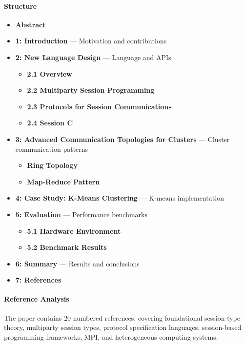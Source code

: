 \documentclass{article}
\begin{document}
\paragraph{Structure}
\begin{itemize}
    \item \textbf{Abstract}

    \item \textbf{1: Introduction} --- Motivation and contributions

    \item \textbf{2: New Language Design} --- Language and APIs
    \begin{itemize}
        \item \textbf{2.1 Overview}
        \item \textbf{2.2 Multiparty Session Programming}
        \item \textbf{2.3 Protocols for Session Communications}
        \item \textbf{2.4 Session C}
    \end{itemize}

    \item \textbf{3: Advanced Communication Topologies for Clusters} --- Cluster communication patterns
    \begin{itemize}
        \item \textbf{Ring Topology}
        \item \textbf{Map-Reduce Pattern}
    \end{itemize}

    \item \textbf{4: Case Study: K-Means Clustering} --- K-means implementation

    \item \textbf{5: Evaluation} --- Performance benchmarks
    \begin{itemize}
        \item \textbf{5.1 Hardware Environment}
        \item \textbf{5.2 Benchmark Results}
    \end{itemize}

    \item \textbf{6: Summary} --- Results and conclusions

    \item \textbf{7: References}
\end{itemize}

\paragraph{Reference Analysis}
The paper contains 20 numbered references, covering foundational session-type theory, multiparty session types, protocol specification languages, session-based programming frameworks, MPI, and heterogeneous computing systems.
\end{document}
